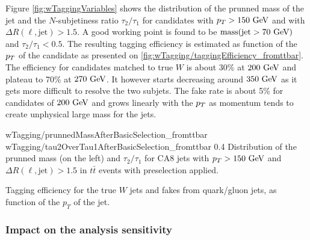            Figure \ref{fig:wTaggingVariables} shows the distribution of the prunned mass of
            the jet and the $N$-subjetiness ratio $\tau_2 / \tau_1$ for candidates with
            $p_T > 150~\text{GeV}$ and with $\Delta R(\ell,\text{jet}) > 1.5$. A good working point
            is found to be $\text{mass}(\text{jet} > 70~\text{GeV})$ and $\tau_2 / \tau_1 < 0.5$.
            The resulting tagging efficiency is estimated as function of the $p_T$ of the
            candidate as presented on \ref{fig:wTagging/taggingEfficiency_fromttbar}. 
            The efficiency for candidates matched
            to true $W$ is about 30\% at $200~\text{GeV}$ and plateau to 70\% at $270~\text{GeV}$. It
            however starts decreasing around $350~\text{GeV}$ as it gets more difficult to resolve
            the two subjets. The fake rate is about 5\% for candidates of $200~\text{GeV}$ and
            grows linearly with the $p_T$ as momentum tends to create unphysical large
            mass for the jets.

                             {wTagging/prunnedMassAfterBasicSelection_fromttbar}
                             {wTagging/tau2OverTau1AfterBasicSelection_fromttbar}
                             {0.4}
                             {Distribution of the prunned mass (on the left) and $\tau_2 
                             / \tau_1$ for CA8 jets with $p_T > 150~\text{GeV}$ and 
                             $\Delta R(\ell,\text{jet}) > 1.5$ in $t\bar{t}$ events
                             with preselection applied.}

                         {Tagging efficiency for the true $W$ jets and fakes from quark/gluon
                         jets, as function of the $p_T$ of the jet.}

            \subsubsection{Impact on the analysis sensitivity}
           
        
